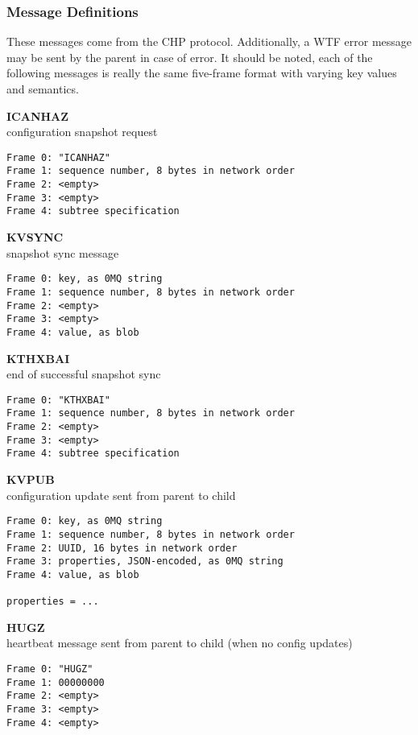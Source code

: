 \subsubsection{Message Definitions}

These messages come from the CHP protocol. Additionally, a WTF error message may be sent by the parent in case of error.
It should be noted, each of the following messages is really the same five-frame format with varying key values and
semantics.

\textbf{ICANHAZ} \\
configuration snapshot request

\begin{verbatim}
Frame 0: "ICANHAZ"
Frame 1: sequence number, 8 bytes in network order
Frame 2: <empty>
Frame 3: <empty>
Frame 4: subtree specification
\end{verbatim}

\textbf{KVSYNC} \\
snapshot sync message

\begin{verbatim}
Frame 0: key, as 0MQ string
Frame 1: sequence number, 8 bytes in network order
Frame 2: <empty>
Frame 3: <empty>
Frame 4: value, as blob
\end{verbatim}

\textbf{KTHXBAI} \\
end of successful snapshot sync

\begin{verbatim}
Frame 0: "KTHXBAI"
Frame 1: sequence number, 8 bytes in network order
Frame 2: <empty>
Frame 3: <empty>
Frame 4: subtree specification
\end{verbatim}

\textbf{KVPUB} \\
configuration update sent from parent to child

\begin{verbatim}
Frame 0: key, as 0MQ string
Frame 1: sequence number, 8 bytes in network order
Frame 2: UUID, 16 bytes in network order
Frame 3: properties, JSON-encoded, as 0MQ string
Frame 4: value, as blob

properties = ...
\end{verbatim}

\textbf{HUGZ} \\
heartbeat message sent from parent to child (when no config updates)

\begin{verbatim}
Frame 0: "HUGZ"
Frame 1: 00000000
Frame 2: <empty>
Frame 3: <empty>
Frame 4: <empty>
\end{verbatim}
